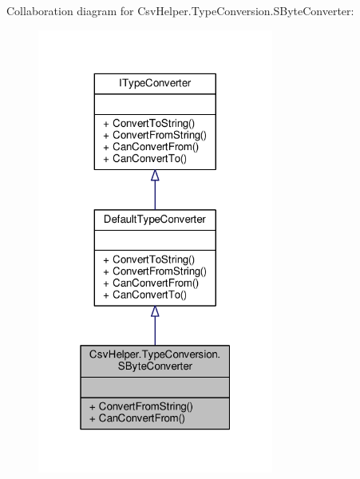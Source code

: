 Collaboration diagram for Csv\-Helper.\-Type\-Conversion.\-S\-Byte\-Converter\-:
\nopagebreak
\begin{figure}[H]
\begin{center}
\leavevmode
\includegraphics[width=220pt]{a00543}
\end{center}
\end{figure}
